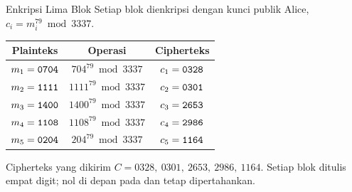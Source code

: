 \documentclass[aspectratio=169,11pt]{beamer}
\begin{document}
\begin{frame}{Enkripsi Lima Blok}
    \footnotesize
    Setiap blok dienkripsi dengan kunci publik Alice,
    $c_i = m_i^{79} \bmod 3337$.
    \vspace{0.1cm}
    \begin{center}
    \begin{tabular}{@{}c c c@{}}
        \toprule
        \textbf{Plainteks} & \textbf{Operasi} & \textbf{Cipherteks} \\
        \midrule
        $m_1 = \texttt{0704}$ & $704^{79} \bmod 3337$  & $c_1 = \texttt{0328}$ \\
        $m_2 = \texttt{1111}$ & $1111^{79} \bmod 3337$ & $c_2 = \texttt{0301}$ \\
        $m_3 = \texttt{1400}$ & $1400^{79} \bmod 3337$ & $c_3 = \texttt{2653}$ \\
        $m_4 = \texttt{1108}$ & $1108^{79} \bmod 3337$ & $c_4 = \texttt{2986}$ \\
        $m_5 = \texttt{0204}$ & $204^{79} \bmod 3337$  & $c_5 = \texttt{1164}$ \\
        \bottomrule
    \end{tabular}
    \end{center}
    \vspace{0.1cm}
    \begin{exampleblock}{Cipherteks yang dikirim}
        \footnotesize
        $C = 0328,\ 0301,\ 2653,\ 2986,\ 1164$. Setiap blok ditulis empat
        digit; nol di depan pada  dan  tetap
        dipertahankan.
    \end{exampleblock}
\end{frame}
\end{document}
